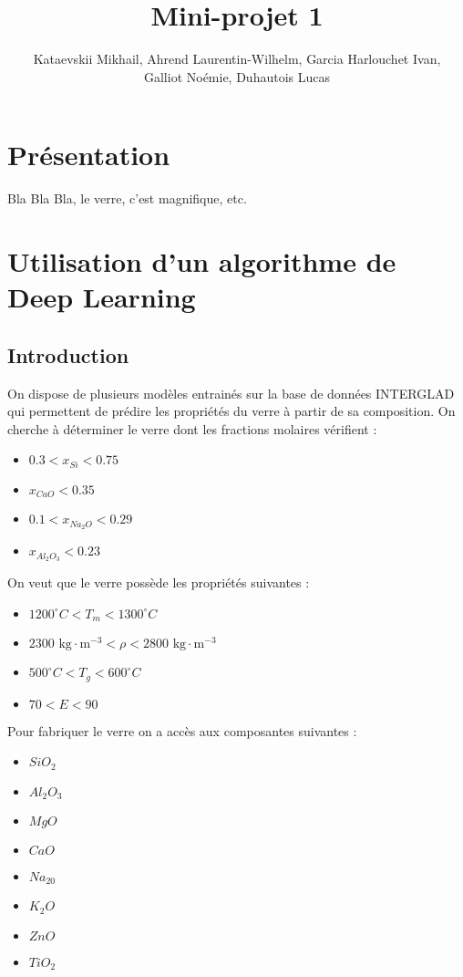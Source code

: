 \documentclass{article}
\title{Mini-projet 1}
\author{Kataevskii Mikhail, Ahrend Laurentin-Wilhelm, Garcia Harlouchet Ivan, \\ Galliot Noémie, Duhautois Lucas}
\begin{document}
\maketitle

\section{Présentation}

Bla Bla Bla, le verre, c'est magnifique, etc.

\section{Utilisation d'un algorithme de Deep Learning}
\subsection{Introduction}

On dispose de plusieurs modèles entrainés sur la base de données INTERGLAD qui permettent de prédire les propriétés du verre à partir de sa composition. On cherche à déterminer le verre dont les fractions molaires vérifient :
\begin{itemize}
    \item $0.3 < x_{Si} < 0.75$
    \item $x_{CaO} < 0.35$
    \item $0.1 < x_{Na_2O} < 0.29$
    \item $x_{Al_2O_3} < 0.23$
\end{itemize}
On veut que le verre possède les propriétés suivantes :
\begin{itemize}
    \item $1200 ^{\circ} C < T_m < 1300 ^{\circ} C$
    \item $2300 \text{ kg} \cdot \text{m}^{-3} < \rho < 2800 \text{ kg} \cdot \text{m}^{-3}$
    \item $500 ^{\circ} C < T_g < 600 ^{\circ} C$
    \item $70 < E < 90$
\end{itemize}
Pour fabriquer le verre on a accès aux composantes suivantes :
\begin{itemize}
    \item $SiO_2$
    \item $Al_2O_3$
    \item $MgO$
    \item $CaO$
    \item $Na_20$
    \item $K_2O$
    \item $ZnO$
    \item $TiO_2$
\end{itemize}
\end{document}
